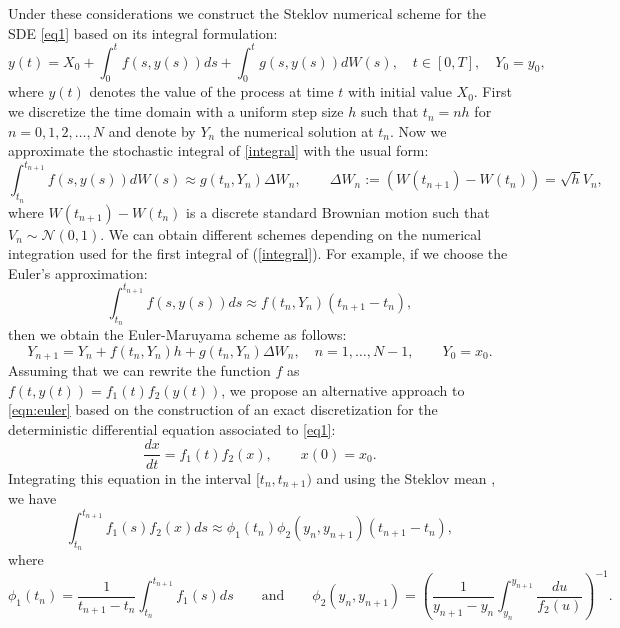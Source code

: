 
	Under these considerations we construct the Steklov numerical scheme for the SDE
	\eqref{eq1} based on its  integral formulation:
	\begin{equation}\label{integral} 
		y(t)= X_0+\int_0^t 
		f(s,y(s)) ds+ \int_0^t 
		g(s,y(s)) dW(s),   \quad t\in[0,T], \quad Y_0=y_0,
	\end{equation} 
	where $y(t)$  denotes the value of the process at time $t$ with initial value  $X_0$.
	First we discretize the time domain with a uniform  step size $h$ such that $t_n=nh$
	for $n=0,1,2,\dots,N$ and denote by $Y_n$  the numerical solution at $t_n$. Now we
	approximate the stochastic integral of \eqref{integral} with the usual form:
	\begin{equation}\label{discret} 
		\int_{t_n}^{t_{n+1}}f(s,y(s)) dW(s)\approx g(t_n,Y_n)\Delta W_n, \qquad
		\Delta W_n:=(W(t_{n+1})-W(t_n))=\sqrt{h} V_n,
	\end{equation} 
	where $W(t_{n+1})-W(t_n)$ is a discrete standard Brownian motion such that $V_n\sim
	\mathcal{N}(0,1)$. We can obtain different schemes depending on the numerical
	integration used for the first integral of (\ref{integral}). For example, if we choose
	the Euler's approximation:  
	\begin{equation}\label{eqn:euler} 
		\int_{t_n}^{t_{n+1}} f(s, y(s))ds\approx 
		f(t_n,Y_n)(t_{n+1}-t_n), 
	\end{equation} 
		then we obtain the Euler-Maruyama scheme as follows:
	\begin{equation}\label{EM} 
		Y_{n+1}=Y_n + f(t_n,Y_n)h + g(t_n,Y_n)\Delta W_n, 
		\quad n=1,\dots,N-1, \qquad Y_0=x_0. 
	\end{equation} 
	Assuming that we can rewrite the function $f$ as $f(t,y(t))=f_1(t)f_2(y(t))$, we
	propose  an alternative approach to \eqref{eqn:euler} based on the construction of an
	exact  discretization for the deterministic  differential equation associated to
	\eqref{eq1}:
	\begin{equation}\label{eqn:DeterODE}
		\frac{dx}{dt}=f_1(t)f_2(x), \qquad x(0)=x_0.
	\end{equation}
	Integrating this equation in the interval $[t_n,t_{n+1})$ and 
	using the Steklov mean  \cite{Matus2005}, we have
	\begin{equation}\label{stek1}
		\int_{t_n}^{t_{n+1}} f_1(s)f_2(x)ds \approx
		\phi_1(t_n)\phi_2(y_n,y_{n+1})(t_{n+1}-t_n),
	\end{equation}
		where
		\begin{equation*}
			\phi_1(t_n)=\frac{1}{t_{n+1}-t_n}\int_{t_n}^{t_{n+1}} f_1(s)ds\qquad 
			\mbox{and} \qquad
			\phi_2(y_n,y_{n+1})=\left(\frac{1}{y_{n+1}-y_{n}} 
			\int_{y_n}^{y_{n+1}} 
			\frac{du}{f_2(u)} 
			\right)^{-1}. 
	\end{equation*}
